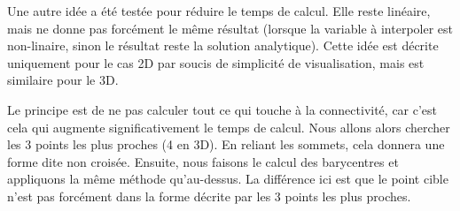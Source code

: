 \vspace{0.5cm}

Une autre idée a été testée pour réduire le temps de calcul. Elle reste linéaire, mais ne donne pas forcément le même résultat (lorsque la variable à interpoler est non-linaire, sinon le résultat reste la solution analytique). Cette idée est décrite uniquement pour le cas 2D par soucis de simplicité de visualisation, mais est similaire pour le 3D.

Le principe est de ne pas calculer tout ce qui touche à la connectivité, car c'est cela qui augmente significativement le temps de calcul.
Nous allons alors chercher les 3 points les plus proches (4 en 3D). En reliant les sommets, cela donnera une forme dite non croisée. 
Ensuite, nous faisons le calcul des barycentres et appliquons la même méthode qu'au-dessus.
La différence ici est que le point cible n'est pas forcément dans la forme décrite par les 3 points les plus proches.

\begin{center}
\end{center}


